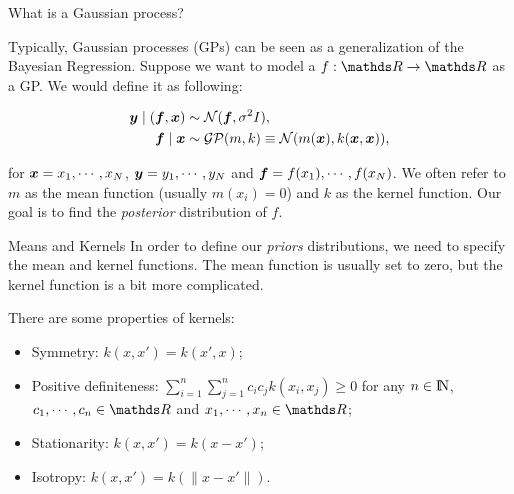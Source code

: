 \documentclass[xcolor=dvipsnames,t,aspectratio=169]{beamer} %
\newcommand{\highlight}[1]{{\color{fgv_light_blue} #1}}
\begin{document}
\begin{frame}[c]{What is a \highlight{Gaussian process}?}

Typically, \highlight{Gaussian processes} (GPs) can be seen as a generalization of the \highlight{Bayesian Regression}. Suppose we want to model a $f: \bR \to \bR$ as a GP. We would \highlight{define} it as following:

\begin{align*}
        \boldsymbol{y} \mid (\boldsymbol{f}, \boldsymbol{x}) &\sim \mathcal{N}(\boldsymbol{f}, \sigma^2 I),\\
        \boldsymbol{f} \mid \boldsymbol{x} &\sim \mathcal{GP}(m, k) \equiv \mathcal{N}(m(\boldsymbol{x}), k(\boldsymbol{x}, \boldsymbol{x})), 
    \end{align*}

    for $\boldsymbol{x} = x_1, \cdots, x_N$, $\boldsymbol{y} =  y_1, \cdots, y_N$ and $\boldsymbol{f} =  f(x_1), \cdots, f(x_N)$. We often refer to $m$ as the \highlight{mean} function (usually $m(x_i) = 0$) and $k$ as the \highlight{kernel} function. Our goal is to find the \highlight{\textit{posterior} distribution} of $f$.

\end{frame}

\begin{frame}[c]{\highlight{Means} and \highlight{Kernels}}
    In order to define our \textit{priors} distributions, we need to specify the \highlight{mean} and \highlight{kernel} functions. The \highlight{mean} function is usually set to zero, but the \highlight{kernel} function is a bit more complicated.

    There are some properties of kernels:
    \begin{itemize}
        \item \highlight{Symmetry}: $k(x, x') = k(x', x)$;
        \item \highlight{Positive definiteness}: $\sum_{i=1}^n \sum_{j=1}^n c_i c_j k(x_i, x_j) \geq 0$ for any $n \in {\rm I\!N}$, $c_1, \cdots, c_n \in \bR$ and $x_1, \cdots, x_n \in \bR$;
        \item \highlight{Stationarity}: $k(x, x') = k(x - x')$;
        \item \highlight{Isotropy}: $k(x, x') = k(\|x - x'\|)$.
    \end{itemize}
\end{frame}
\end{document}
